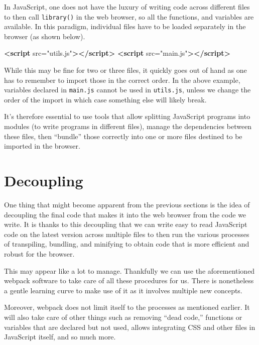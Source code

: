 \documentclass[10pt,]{krantz}
\makeatletter
\newenvironment{Shaded}{\begin{snugshade}}{\end{snugshade}}
\newcommand{\KeywordTok}[1]{\textcolor[rgb]{0.27,0.27,0.27}{\textbf{#1}}}
\newcommand{\OtherTok}[1]{\textcolor[rgb]{0.37,0.37,0.37}{#1}}
\newcommand{\StringTok}[1]{\textcolor[rgb]{0.5,0.5,0.5}{#1}}
\newenvironment{kframe}{%
\medskip{}
\setlength{\fboxsep}{.8em}
 \def\at@end@of@kframe{}%
 \ifinner\ifhmode%
  \def\at@end@of@kframe{\end{minipage}}%
  \begin{minipage}{\columnwidth}%
 \fi\fi%
 \def\FrameCommand##1{\hskip\@totalleftmargin \hskip-\fboxsep
 \colorbox{shadecolor}{##1}\hskip-\fboxsep
     \hskip-\linewidth \hskip-\@totalleftmargin \hskip\columnwidth}%
 \MakeFramed {\advance\hsize-\width
   \@totalleftmargin\z@ \linewidth\hsize
   \@setminipage}}%
 {\par\unskip\endMakeFramed%
 \at@end@of@kframe}
\renewenvironment{Shaded}{\begin{kframe}}{\end{kframe}}
\makeatother
\begin{document}
In JavaScript, one does not have the luxury of writing code across different files to then call \texttt{library()} in the web browser, so all the functions, and variables are available. In this paradigm, individual files have to be loaded separately in the browser (as shown below).

\begin{Shaded}
\begin{Highlighting}[]
\KeywordTok{<script}\OtherTok{ src=}\StringTok{"utils.js"}\KeywordTok{></script>}
\KeywordTok{<script}\OtherTok{ src=}\StringTok{"main.js"}\KeywordTok{></script>}
\end{Highlighting}
\end{Shaded}

While this may be fine for two or three files, it quickly goes out of hand as one has to remember to import those in the correct order. In the above example, variables declared in \texttt{main.js} cannot be used in \texttt{utils.js}, unless we change the order of the import in which case something else will likely break.

It's therefore essential to use tools that allow splitting JavaScript programs into modules (to write programs in different files), manage the dependencies between these files, then ``bundle'' those correctly into one or more files destined to be imported in the browser.

\hypertarget{webpack-decouple}{%
\section{Decoupling}\label{webpack-decouple}}

One thing that might become apparent from the previous sections is the idea of decoupling the final code that makes it into the web browser from the code we write. It is thanks to this decoupling that we can write easy to read JavaScript code on the latest version across multiple files to then run the various processes of transpiling, bundling, and minifying to obtain code that is more efficient and robust for the browser.

This may appear like a lot to manage. Thankfully we can use the aforementioned webpack software to take care of all these procedures for us. There is nonetheless a gentle learning curve to make use of it as it involves multiple new concepts.

Moreover, webpack does not limit itself to the processes as mentioned earlier. It will also take care of other things such as removing ``dead code,'' functions or variables that are declared but not used, allows integrating CSS and other files in JavaScript itself, and so much more.
\end{document}
